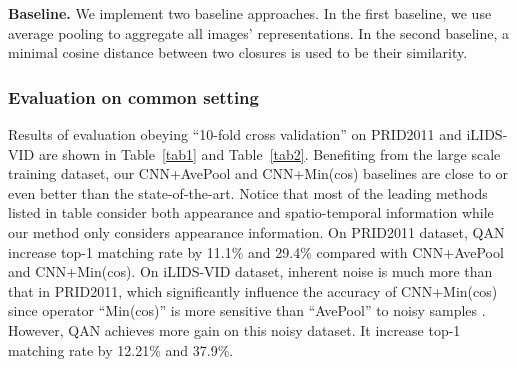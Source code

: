 \documentclass[10pt,twocolumn,letterpaper]{article}
\begin{document}
\textbf{Baseline.}
We implement two baseline approaches. In the first baseline, we use average pooling to aggregate all images' representations. In the second baseline, a minimal cosine distance between two closures is used to be their similarity.

\subsubsection{Evaluation on common setting}

Results of evaluation obeying ``10-fold cross validation'' on  PRID2011 and iLIDS-VID are shown in Table~\ref{tab1} and Table~\ref{tab2}. Benefiting from the large scale training dataset, our CNN+AvePool and CNN+Min(cos) baselines are close to or even better than the state-of-the-art. Notice that most of the leading methods listed in table consider both appearance and spatio-temporal information while our method only considers appearance information. On PRID2011 dataset, QAN increase  top-1 matching rate by 11.1\% and 29.4\% compared with CNN+AvePool and CNN+Min(cos). On iLIDS-VID dataset, inherent noise is much more than that in PRID2011, which significantly influence the accuracy of CNN+Min(cos) since operator ``Min(cos)'' is more sensitive than ``AvePool'' to noisy samples . However, QAN achieves more gain on this noisy dataset. It increase top-1 matching rate by 12.21\% and 37.9\%. 
\end{document}

